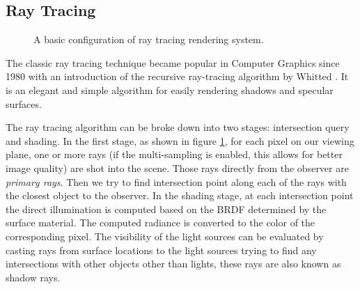 \subsection{Ray Tracing}
\label{sec:mc_rt}

\begin{figure}[ht]
    \centering
    \renewcommand{\thefigure}{\thechapter.\arabic{figure}}
    \caption[Ray Tracing System Configuration]{A basic configuration of ray tracing rendering system.}
    \label{fig:ray_tracing}
\end{figure}

The classic ray tracing technique became popular in Computer Graphics since 1980 with an introduction of the recursive ray-tracing algorithm by Whitted \cite{Whitted1980}. It is an elegant and simple algorithm for easily rendering shadows and specular surfaces.

The ray tracing algorithm can be broke down into two stages: intersection query and shading. In the first stage, as shown in figure \ref{fig:ray_tracing}, for each pixel on our viewing plane, one or more rays (if the multi-sampling is enabled, this allows for better image quality) are shot into the scene. Those rays directly from the observer are \emph{primary rays}. Then we try to find intersection point along each of the rays with the closest object to the observer. In the shading stage, at each intersection point the direct illumination is computed based on the BRDF determined by the surface material. The computed radiance is converted to the color of the corresponding pixel. The visibility of the light sources can be evaluated by casting rays from surface locations to the light sources trying to find any intersections with other objects other than lights, these rays are also known as shadow rays.

